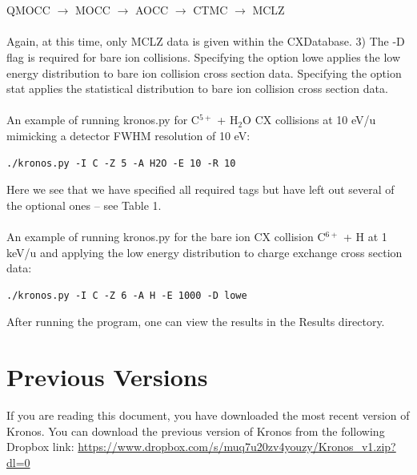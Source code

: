 \documentclass[twocolumn, prb, amsmath,amssymb,amsfonts]{revtex4}
\begin{document}
\\
\\
QMOCC $\rightarrow$ MOCC $\rightarrow$ AOCC $\rightarrow$ CTMC $\rightarrow$ MCLZ \\ \\
Again, at this time, only MCLZ data is given within the CXDatabase.  3) The -D flag is required for bare ion collisions.  Specifying the option lowe applies the low energy distribution to bare ion collision cross section data.  Specifying the option stat applies the statistical distribution to bare ion collision cross section data.  \\
\\
An example of running kronos.py for C$^{5+}$ + H$_2$O CX collisions at 10 eV/u mimicking a detector FWHM resolution of 10 eV:
\begin{verbatim}
./kronos.py -I C -Z 5 -A H2O -E 10 -R 10
\end{verbatim}
Here we see that we have specified all required tags but have left out several of the optional ones -- see Table 1.  
\\
\\
An example of running kronos.py for the bare ion CX collision C$^{6+}$ + H at 1 keV/u and applying the low energy distribution to charge exchange cross section data:
\begin{verbatim}
./kronos.py -I C -Z 6 -A H -E 1000 -D lowe
\end{verbatim}
After running the program, one can view the results in the Results directory.
\section{Previous Versions}
If you are reading this document, you have downloaded the most recent version of Kronos.  
You can download the previous version of Kronos from the following Dropbox link:
\url{https://www.dropbox.com/s/muq7u20zv4youzy/Kronos_v1.zip?dl=0}
\end{document}
